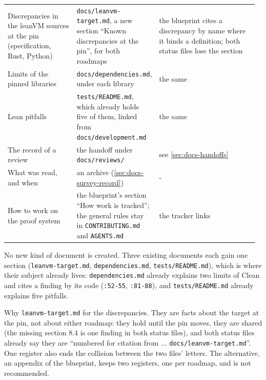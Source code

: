 {\begin{longtable}{@{}>{\raggedright\arraybackslash}p{0.291\linewidth}>{\raggedright\arraybackslash}p{0.233\linewidth}>{\raggedright\arraybackslash}p{0.446\linewidth}@{}}
Discrepancies in the leanVM sources at the pin (specification, Rust, Python) & \texttt{docs/\allowbreak{}leanvm-\allowbreak{}target.\allowbreak{}md}, a new section ``Known discrepancies at the pin'', for both roadmaps & the blueprint cites a discrepancy by name where it binds a definition; both status files lose the section \\\addlinespace[2pt]
Limits of the pinned libraries & \texttt{docs/\allowbreak{}dependencies.\allowbreak{}md}, under each library & the same \\\addlinespace[2pt]
Lean pitfalls & \texttt{tests/\allowbreak{}README.\allowbreak{}md}, which already holds five of them, linked from \texttt{docs/\allowbreak{}development.\allowbreak{}md} & the same \\\addlinespace[2pt]
The record of a review & the handoff under \texttt{docs/\allowbreak{}reviews/\allowbreak{}} & see \cref{sec:docs-handoffs} \\\addlinespace[2pt]
What was read, and when & an archive (\cref{sec:docs-survey-record}) & - \\\addlinespace[2pt]
How to work on the proof system & the blueprint's section ``How work is tracked''; the general rules stay in \texttt{CONTRIBUTING.\allowbreak{}md} and \texttt{AGENTS.\allowbreak{}md} & the tracker links \\
\end{longtable}}

\begin{sloppypar}
No new kind of document is created. Three existing documents each gain one section (\texttt{leanvm-\allowbreak{}target.\allowbreak{}md}, \texttt{dependencies.\allowbreak{}md}, \texttt{tests/\allowbreak{}README.\allowbreak{}md}), which is where their subject already lives: \texttt{dependencies.\allowbreak{}md} already explains two limits of Clean and cites a finding by its code (\texttt{:\allowbreak{}52-\allowbreak{}55}, \texttt{:\allowbreak{}81-\allowbreak{}88}), and \texttt{tests/\allowbreak{}README.\allowbreak{}md} already explains five pitfalls.
\end{sloppypar}

\begin{sloppypar}
Why \texttt{leanvm-\allowbreak{}target.\allowbreak{}md} for the discrepancies. They are facts about the target at the pin, not about either roadmap: they hold until the pin moves, they are shared (the missing section 8.4 is one finding in both status files), and both status files already say they are ``numbered for citation from ... \texttt{docs/\allowbreak{}leanvm-\allowbreak{}target.\allowbreak{}md}''. One register also ends the collision between the two files' letters. The alternative, an appendix of the blueprint, keeps two registers, one per roadmap, and is not recommended.
\end{sloppypar}

